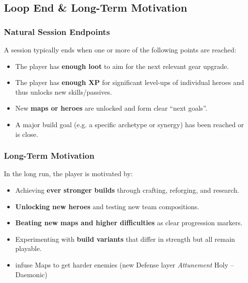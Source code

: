\subsection{Loop End \& Long-Term Motivation}

\subsubsection*{Natural Session Endpoints}

A session typically ends when one or more of the following points are reached:

\begin{itemize}
	\item The player has \textbf{enough loot} to aim for the next relevant gear upgrade.
	\item The player has \textbf{enough XP} for significant level-ups of individual heroes and thus unlocks new skills/passives.
	\item New \textbf{maps or heroes} are unlocked and form clear “next goals”.
	\item A major build goal (e.g. a specific archetype or synergy) has been reached or is close.
\end{itemize}

\subsubsection*{Long-Term Motivation}

In the long run, the player is motivated by:

\begin{itemize}
	\item Achieving \textbf{ever stronger builds} through crafting, reforging, and research.
	\item \textbf{Unlocking new heroes} and testing new team compositions.
	\item \textbf{Beating new maps and higher difficulties} as clear progression markers.
	\item Experimenting with \textbf{build variants} that differ in strength but all remain playable.
	\item infuse Maps to get harder enemies (new Defense layer \textit{Attunement} Holy -- Daemonic)
\end{itemize}

